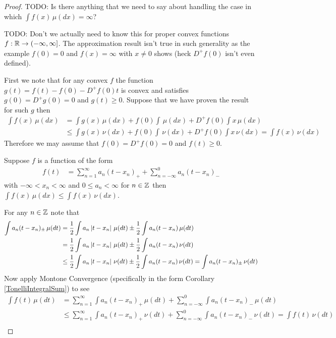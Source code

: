 \begin{proof}
TODO: Is there anything that we need to say about handling the case in which $\int f(x) \, \mu(dx) = \infty$?

TODO: Don't we actually need to know this for proper convex functions $f : \mathbb{R} \to (-\infty,\infty]$.  The approximation result isn't true in such generality as the example $f(0) = 0$ and $f(x) = \infty$ with $x \neq 0$ shows (heck $D^+f(0)$ isn't even defined).

First we note that for any convex $f$ the function $g(t) = f(t) - f(0) - D^+f(0) t$ is convex and satisfies $g(0) = D^+g(0) = 0$ and $g(t) \geq 0$.  Suppose that we have proven the result for such $g$ then
\begin{align*}
\int f(x) \, \mu(dx) &= \int g(x) \, \mu(dx) + f(0) \int \, \mu(dx) + D^+f(0) \int x \, \mu(dx) \\
&\leq \int g(x) \, \nu(dx) + f(0) \int \, \nu(dx) + D^+f(0) \int x \, \nu(dx) = \int f(x) \, \nu(dx)
\end{align*}
Therefore we may assume that $f(0) = D^+f(0) = 0$ and $f(t) \geq 0$.  

\begin{clm}Suppose $f$ is a function of the form 
\begin{align*}
f(t) &= \sum_{n=1}^{\infty} a_n (t - x_n)_+ + \sum_{n=-\infty}^{0} a_n (t - x_n)_-
\end{align*}
with $-\infty < x_n < \infty$ and $0 \leq a_n < \infty$ for $n \in \mathbb{Z}$ then $\int f(x) \, \mu(dx) \leq \int f(x) \, \nu(dx)$.
\end{clm}
For any $n \in \mathbb{Z}$ note that
\begin{align*}
\int a_n (t - x_n)_\pm \, \mu(dt) &= \frac{1}{2} \int a_n \left \vert t - x_n \right \vert  \, \mu(dt) \pm \frac{1}{2} \int a_n (t - x_n)  \, \mu(dt) \\
&= \frac{1}{2} \int a_n \left \vert t - x_n \right \vert  \, \mu(dt) \pm \frac{1}{2} \int a_n (t - x_n)  \, \nu(dt) \\
&\leq  \frac{1}{2} \int a_n \left \vert t - x_n \right \vert  \, \nu(dt) \pm \frac{1}{2} \int a_n (t - x_n)  \, \nu(dt) = \int a_n (t - x_n)_\pm \, \nu(dt) 
\end{align*}
Now apply Montone Convergence (specifically in the form Corollary \ref{TonelliIntegralSum}) to see
\begin{align*}
\int f(t) \, \mu(dt) &= \sum_{n=1}^{\infty} \int a_n (t - x_n)_+ \, \mu(dt) + \sum_{n=-\infty}^{0} \int a_n (t - x_n)_- \, \mu(dt) \\
&\leq \sum_{n=1}^{\infty} \int a_n (t - x_n)_+ \, \nu(dt) + \sum_{n=-\infty}^{0} \int a_n (t - x_n)_- \, \nu(dt)  = \int f(t) \, \nu(dt) \\
\end{align*}


\end{proof}
